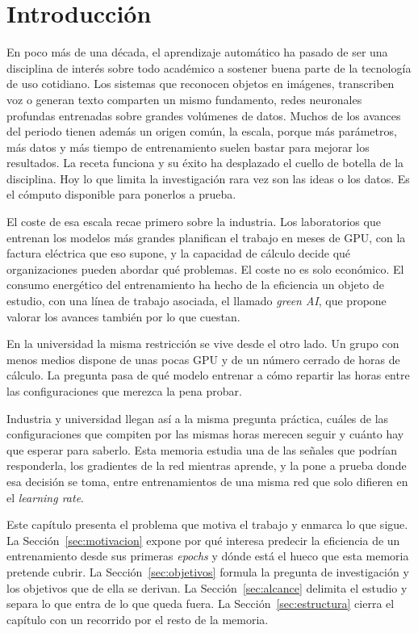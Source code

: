 \chapter{Introducción}
\label{ch:introduccion}

En poco más de una década, el aprendizaje automático ha pasado de ser una disciplina de interés sobre todo académico a sostener buena parte de la tecnología de uso cotidiano. Los sistemas que reconocen objetos en imágenes, transcriben voz o generan texto comparten un mismo fundamento, redes neuronales profundas entrenadas sobre grandes volúmenes de datos. Muchos de los avances del periodo tienen además un origen común, la escala, porque más parámetros, más datos y más tiempo de entrenamiento suelen bastar para mejorar los resultados. La receta funciona y su éxito ha desplazado el cuello de botella de la disciplina. Hoy lo que limita la investigación rara vez son las ideas o los datos. Es el cómputo disponible para ponerlos a prueba.

El coste de esa escala recae primero sobre la industria. Los laboratorios que entrenan los modelos más grandes planifican el trabajo en meses de GPU, con la factura eléctrica que eso supone, y la capacidad de cálculo decide qué organizaciones pueden abordar qué problemas. El coste no es solo económico. El consumo energético del entrenamiento ha hecho de la eficiencia un objeto de estudio, con una línea de trabajo asociada, el llamado \emph{green AI}, que propone valorar los avances también por lo que cuestan.

En la universidad la misma restricción se vive desde el otro lado. Un grupo con menos medios dispone de unas pocas GPU y de un número cerrado de horas de cálculo. La pregunta pasa de qué modelo entrenar a cómo repartir las horas entre las configuraciones que merezca la pena probar.

Industria y universidad llegan así a la misma pregunta práctica, cuáles de las configuraciones que compiten por las mismas horas merecen seguir y cuánto hay que esperar para saberlo. Esta memoria estudia una de las señales que podrían responderla, los gradientes de la red mientras aprende, y la pone a prueba donde esa decisión se toma, entre entrenamientos de una misma red que solo difieren en el \emph{learning rate}.

Este capítulo presenta el problema que motiva el trabajo y enmarca lo que sigue. La Sección~\ref{sec:motivacion} expone por qué interesa predecir la eficiencia de un entrenamiento desde sus primeras \emph{epochs} y dónde está el hueco que esta memoria pretende cubrir. La Sección~\ref{sec:objetivos} formula la pregunta de investigación y los objetivos que de ella se derivan. La Sección~\ref{sec:alcance} delimita el estudio y separa lo que entra de lo que queda fuera. La Sección~\ref{sec:estructura} cierra el capítulo con un recorrido por el resto de la memoria.

